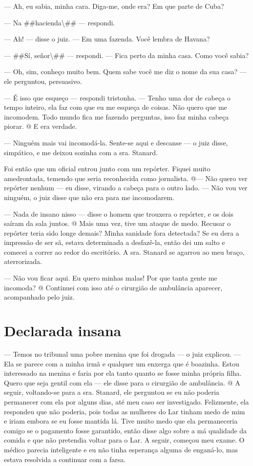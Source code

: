 --- Ah, eu sabia, minha cara. Diga-me, onde era? Em que parte de Cuba?

--- Na \#\#hacienda\textbackslash{}\#\# --- respondi.

--- Ah! --- disse o juiz. --- Em uma fazenda. Você lembra de Havana?

--- \#\#Sí, señor\textbackslash{}\#\# --- respondi. --- Fica perto da
minha casa. Como você sabia?

--- Oh, sim, conheço muito bem. Quem sabe você me diz o nome da sua
casa? --- ele perguntou, persuasivo.

--- É isso que esqueço --- respondi tristonha. --- Tenho uma dor de
cabeça o tempo inteiro, ela faz com que eu me esqueça de coisas. Não
quero que me incomodem. Todo mundo fica me fazendo perguntas, isso faz
minha cabeça piorar. @ E era verdade.

--- Ninguém mais vai incomodá-la. Sente-se aqui e descanse --- o juiz
disse, simpático, e me deixou sozinha com a sra. Stanard.

Foi então que um oficial entrou junto com um repórter. Fiquei muito
amedrontada, temendo que seria reconhecida como jornalista. @--- Não
quero ver repórter nenhum --- eu disse, virando a cabeça para o outro
lado. --- Não vou ver ninguém, o juiz disse que não era para me
incomodarem.

--- Nada de insano nisso --- disse o homem que trouxera o repórter, e os
dois saíram da sala juntos. @ Mais uma vez, tive um ataque de medo.
Recusar o repórter teria sido longe demais? Minha sanidade fora
detectada? Se eu dera a impressão de ser sã, estava determinada a
desfazê-la, então dei um salto e comecei a correr ao redor do
escritório. A sra. Stanard se agarrou ao meu braço, aterrorizada.

--- Não vou ficar aqui. Eu quero minhas malas! Por que tanta gente me
incomoda? @ Continuei com isso até o cirurgião de ambulância aparecer,
acompanhado pelo juiz.

\label{section-2}

\chapter{Declarada
insana}\label{capuxedtulo-v-declarada-insana}

--- Temos no tribunal uma pobre menina que foi drogada --- o juiz
explicou. --- Ela se parece com a minha irmã e qualquer um enxerga que é
boazinha. Estou interessado na menina e faria por ela tanto quanto se
fosse minha própria filha. Quero que seja gentil com ela --- ele disse
para o cirurgião de ambulância. @ A seguir, voltando-se para a sra.
Stanard, ele perguntou se eu não poderia permanecer com ela por alguns
dias, até meu caso ser investigado. Felizmente, ela respondeu que não
poderia, pois todas as mulheres do Lar tinham medo de mim e iriam embora
se eu fosse mantida lá. Tive muito medo que ela permaneceria comigo se o
pagamento fosse garantido, então disse algo sobre a má qualidade da
comida e que não pretendia voltar para o Lar. A seguir, começou meu
exame. O médico parecia inteligente e eu não tinha esperança alguma de
enganá-lo, mas estava resolvida a continuar com a farsa.


